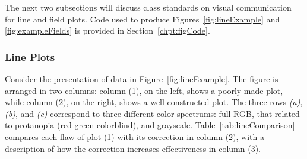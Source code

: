 The next two subsections will discuss class standards on visual communication for line and field plots. Code used to produce Figures~\ref{fig:lineExample} and \ref{fig:exampleFields} is provided in Section~\ref{chpt:figCode}.

\newpage
\subsubsection{Line Plots}
Consider the presentation of data in Figure~\ref{fig:lineExample}. The figure is arranged in two columns: column (1), on the left, shows a poorly made plot, while column (2), on the right, shows a well-constructed plot. The three rows \emph{(a)}, \emph{(b)}, and \emph{(c)} correspond to three different color spectrums: full RGB, that related to protanopia (red-green colorblind), and grayscale. Table~\ref{tab:lineComparison} compares each flaw of plot (1) with its correction in column (2), with a description of how the correction increases effectiveness in column (3).
